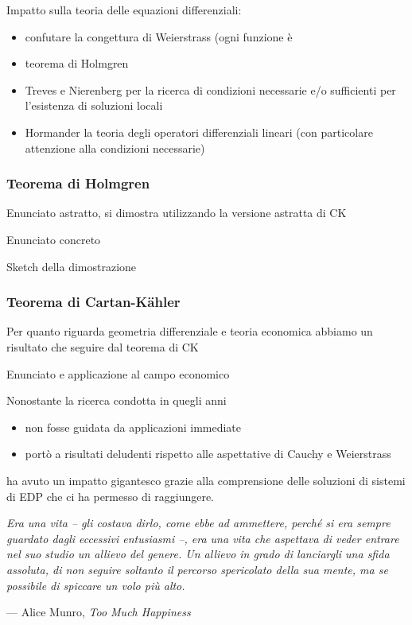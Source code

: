 \documentclass[serif,notheorems]{beamer}
\theoremstyle{plain} %
\theoremstyle{definition} %
\theoremstyle{remark}
\begin{document}
\begin{frame}
Impatto sulla teoria delle equazioni differenziali:
\begin{itemize}
\item confutare la congettura di Weierstrass (ogni funzione è 
\item teorema di Holmgren
\item Treves e Nierenberg per la ricerca di condizioni necessarie e/o sufficienti per l'esistenza di soluzioni locali
\item Hormander la teoria degli operatori differenziali lineari (con particolare attenzione alla condizioni necessarie)
\end{itemize}
\end{frame}

\begin{frame}
\frametitle{Teorema di Holmgren}
Enunciato astratto, si dimostra utilizzando la versione astratta di CK
\end{frame}


\begin{frame}
Enunciato concreto
\end{frame}

\begin{frame}
Sketch della dimostrazione
\end{frame}

\begin{frame}
\frametitle{Teorema di Cartan-Kähler}
Per quanto riguarda geometria differenziale e teoria economica abbiamo un risultato che seguire dal teorema di CK

Enunciato e applicazione al campo economico
\end{frame}

\begin{frame}
Nonostante la ricerca condotta in quegli anni
\begin{itemize}
\item non fosse guidata da applicazioni immediate
\item portò a risultati deludenti rispetto alle aspettative di Cauchy e Weierstrass
\end{itemize}
ha avuto un impatto gigantesco grazie alla comprensione delle soluzioni di sistemi di EDP che ci ha permesso di raggiungere.
\end{frame}

\begin{frame}

\begin{center}
\textit{
Era una vita -- gli costava dirlo, come ebbe ad ammettere,
perché si era sempre guardato dagli eccessivi entusiasmi --, era una vita
che aspettava di veder entrare nel suo studio un allievo del genere. 
Un allievo in grado di lanciargli una sfida assoluta, 
di non seguire soltanto il percorso spericolato della sua mente, 
ma se possibile di spiccare un volo più alto.
}
\end{center}
\null\hfill --- Alice Munro, \textit{Too Much Happiness}
\end{frame}
\end{document}

